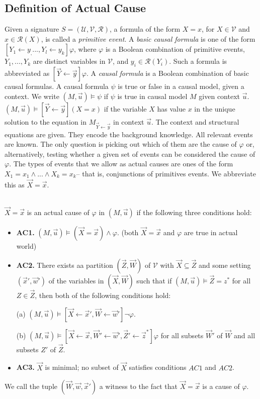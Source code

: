 \documentclass{article}
\begin{document}
\subsection{Definition of Actual Cause}
Given a signature $S= (\mathcal{U},\mathcal{V},\mathcal{R})$, a formula of the form $X =x$, for $X \in \mathcal{V}$ and $x \in \mathcal{R}(X)$, is called a \textit{primitive event}.
A \textit{basic causal formula} is one of the form $[Y_1 \leftarrow y_, ..., Y_l\leftarrow y_k]\varphi$, where $\varphi$ is a Boolean combination of primitive events, $Y_1,...,Y_k$ are distinct variables in $\mathcal{V}$, and $y_i \in \mathcal{R}(Y_i)$.
Such a formula is abbreviated as $[\vec{Y}\leftarrow\vec{y}]\varphi$.
A \textit{causal formula} is a Boolean combination of basic causal formulas.
A causal formula $\psi$ is true or false in a causal model, given a context.
We write $(M,\vec u)\models \psi$ if $\psi$ is true in causal model $M$ given context $\vec u$.
$(M,\vec u)\models [\vec Y\leftarrow \vec y](X=x)$ if the variable $X$ has value $x$ in the unique solution to the equation in $M_{\vec{Y} \leftarrow \vec{y}}$ in context $\vec u$.
The context and structural equations are given.
They encode the background knowledge.
All relevant events are known.
The only question is picking out which of them are the cause of $\varphi$ or, alternatively, testing whether a given set of events can be considered the cause of $\varphi$.
The types of events that we allow as actual causes are ones of the form $X_1 = x_1 \wedge ... \wedge X_k=x_k$-- that is, conjunctions of primitives events.
We abbreviate this as $\vec X = \vec x$.
\\
\\
\begin{definition}

    $\vec X = \vec x$ is an actual cause of $\varphi$ in $(M,\vec u)$ if the following three conditions hold:
    \begin{itemize}
        \item  \textbf{AC1.} $(M,\vec u)\models (\vec X = \vec x) \wedge \varphi$.
              (both $\vec X = \vec x$ and $\varphi$ are true in actual world)
        \item  \textbf{AC2. }There exists aa partition $(\vec Z, \vec W)$ of $\mathcal{V}$ with $\vec X \subseteq \vec Z$ and some setting $(\vec x',\vec w')$ of the variables in $(\vec X,\vec W)$ such that if $(M,\vec u)\models \vec Z = z^*$ for all $Z\in \vec Z$, then both of the following conditions hold:

              (a) $(M,\vec u)\models[\vec X \leftarrow \vec x', \vec W \leftarrow \vec w']\neg \varphi$.

              (b) $(M,\vec u)\models[\vec X\leftarrow \vec x, \vec W' \leftarrow \vec w', \vec Z'\leftarrow \vec z^*]\varphi$ for all subsets $\vec W'$ of $\vec W$ and all subsets $Z'$ of $\vec Z$.

        \item  \textbf{AC3.} $\vec X$ is minimal; no subset of $\vec X$ satisfies conditions $AC1$ and $AC2$.
    \end{itemize}
\end{definition}
We call the tuple $(\vec W, \vec w,\vec x')$ a witness to the fact that $\vec X=\vec x$ is a cause of $\varphi$.
\end{document}
